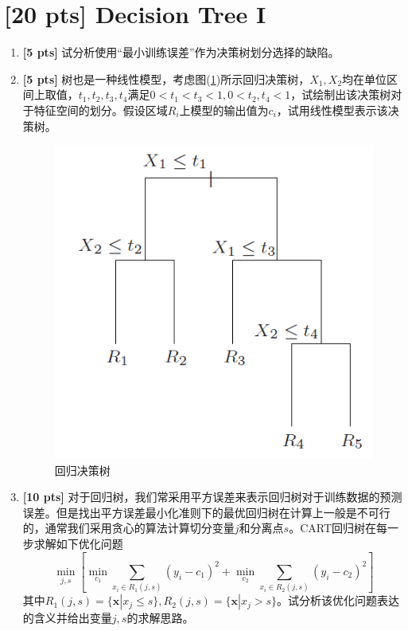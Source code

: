 \documentclass[a4paper,UTF8]{article}
\theoremstyle{definition}
\begin{document}
\newpage
\section{[20 pts] Decision Tree I}
\begin{enumerate}[(1)]
	\item \textbf{[5 pts]} 试分析使用“最小训练误差”作为决策树划分选择的缺陷。
	\item \textbf{[5 pts]}  树也是一种线性模型，考虑图(\ref{img})所示回归决策树，$X_1,X_2$均在单位区间上取值，$t_1,t_2,t_3,t_4$满足$0<t_1<t_3<1,0<t_2,t_4<1$，试绘制出该决策树对于特征空间的划分。假设区域$R_i$上模型的输出值为$c_i$，试用线性模型表示该决策树。
	\begin{figure}[htbp]
		\centering
		\includegraphics[width=.4\textwidth]{figure/regression_tree.png} %
		\caption{回归决策树} %
		\label{img} %
	\end{figure}
	\item \textbf{[10 pts]} 对于回归树，我们常采用平方误差来表示回归树对于训练数据的预测误差。但是找出平方误差最小化准则下的最优回归树在计算上一般是不可行的，通常我们采用贪心的算法计算切分变量$j$和分离点$s$。CART回归树在每一步求解如下优化问题
	$$\min _{j, s}\left[\min _{c_1} \sum_{x_{i} \in R_{1}(j, s)}\left(y_{i}-c_{1}\right)^{2}+\min _{c_{2}} \sum_{x_{i} \in R_{2}(j, s)}\left(y_{i}-c_{2}\right)^{2}\right]$$
	其中$R_1(j,s)=\{\boldsymbol{x}|x_j\leq s\},R_2(j,s)=\{\boldsymbol{x}|x_j>s\}$。试分析该优化问题表达的含义并给出变量$j,s$的求解思路。
\end{enumerate}
\end{document}

